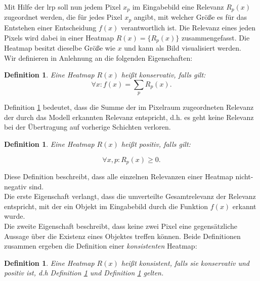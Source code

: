 \documentclass[twoside, 12pt,a4paper]{book}
\def\emph#1{\textit{#1}}
\newtheorem{definition}[theorem]{Definition}
\numberwithin{equation}{section}
\begin{document}
	\noindent Mit Hilfe der \ac{lrp} soll nun jedem Pixel $x_p$ im Eingabebild eine Relevanz $R_p(x)$ zugeordnet werden, die für jedes Pixel $x_p$ angibt, mit welcher Größe es für das Entstehen einer Entscheidung $f(x)$ verantwortlich ist. Die Relevanz eines jeden Pixels wird dabei in einer Heatmap $R(x) = \lbrace R_p(x) \rbrace$ zusammengefasst. Die Heatmap besitzt dieselbe Größe wie $x$ und kann als Bild visualisiert werden. \\
	
	\noindent Wir definieren in Anlehnung an \cite{LRP_first_paper} die folgenden Eigenschaften:
	
	\begin{definition}\label{def_konservativ}
		Eine Heatmap $R(x)$ heißt \emph{konservativ}, falls gilt:
		\begin{equation}
		\forall x: f(x) = \sum_p R_p(x).
		\end{equation}
	\end{definition}	
	\noindent Definition \ref{def_konservativ} bedeutet, dass die Summe der im Pixelraum zugeordneten Relevanz der durch das Modell erkannten Relevanz entspricht, d.h. es geht keine Relevanz bei der Übertragung auf vorherige Schichten verloren.
	
	
	
	\begin{definition} \label{def_pos}
		Eine Heatmap $R(x)$ heißt \emph{positiv}, falls gilt:
		
		\begin{equation}
		\forall x,p: R_p(x) \geq 0.
		\end{equation}
	\end{definition}	
	
	\noindent Diese Definition beschreibt, dass alle einzelnen Relevanzen einer Heatmap nicht-negativ sind.\\
		
	
	\noindent Die erste Eigenschaft verlangt, dass die umverteilte Gesamtrelevanz der Relevanz entspricht, mit der ein Objekt im Eingabebild durch die Funktion $f(x)$ erkannt wurde.\\
	
	\noindent Die zweite Eigenschaft beschreibt, dass keine zwei Pixel eine gegensätzliche Aussage über die Existenz eines Objektes treffen können. Beide Definitionen zusammen ergeben die Definition einer \textit{konsistenten} Heatmap:
	
	\begin{definition}
		Eine Heatmap $R(x)$ heißt \emph{konsistent}, falls sie konservativ und positiv ist, d.h Definition \ref{def_konservativ} und Definition \ref{def_pos} gelten.
	\end{definition}
	
\end{document}
